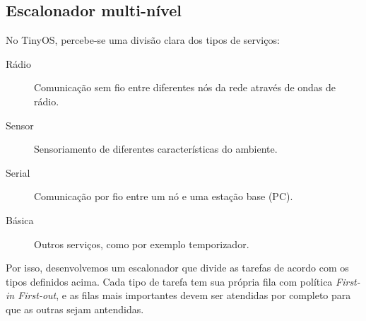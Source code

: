 \subsection{Escalonador multi-nível}
No TinyOS, percebe-se uma divisão clara dos tipos de serviços: 
\begin{description}
    \item[Rádio] Comunicação sem fio entre diferentes nós da rede através de ondas de rádio.
    \item[Sensor] Sensoriamento de diferentes características do ambiente.
    \item[Serial] Comunicação por fio entre um nó e uma estação base (PC).
    \item[Básica] Outros serviços, como por exemplo temporizador.
\end{description}
Por isso, desenvolvemos um escalonador que divide as tarefas de acordo com os tipos definidos acima.
Cada tipo de tarefa tem sua própria fila com política \textit{First-in First-out}, e as filas mais importantes devem ser
atendidas por completo para que as outras sejam antendidas.



